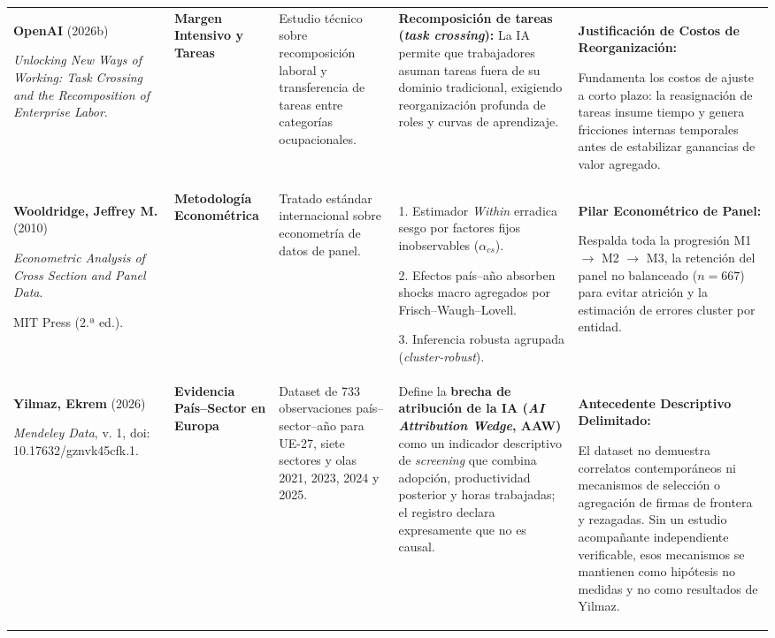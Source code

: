 \documentclass[10pt,a4paper,landscape]{article}
\begin{document}
\begin{xltabular}{\textwidth}{@{} L{4.5cm} L{3.3cm} Y Y Y @{}}
  \textbf{OpenAI} (2026b)\par
  \textit{Unlocking New Ways of Working: Task Crossing and the Recomposition of Enterprise Labor}.\par
  [\texttt{openai2026taskcrossing}] &
  \textbf{Margen Intensivo y Tareas} &
  Estudio técnico sobre recomposición laboral y transferencia de tareas entre categorías ocupacionales. &
  \textbf{Recomposición de tareas (\textit{task crossing}):} La IA permite que trabajadores asuman tareas fuera de su dominio tradicional, exigiendo reorganización profunda de roles y curvas de aprendizaje. &
  \textbf{Justificación de Costos de Reorganización:}\par
  Fundamenta los costos de ajuste a corto plazo: la reasignación de tareas insume tiempo y genera fricciones internas temporales antes de estabilizar ganancias de valor agregado. \\
  \textbf{Wooldridge, Jeffrey M.} (2010)\par
  \textit{Econometric Analysis of Cross Section and Panel Data}.\par
  MIT Press (2.ª ed.).\par
  [\texttt{wooldridge2010econometric}] &
  \textbf{Metodología Econométrica} &
  Tratado estándar internacional sobre econometría de datos de panel. &
  1. Estimador \textit{Within} erradica sesgo por factores fijos inobservables ($\alpha_{cs}$).\par
  2. Efectos país--año absorben shocks macro agregados por Frisch--Waugh--Lovell.\par
  3. Inferencia robusta agrupada (\textit{cluster-robust}). &
  \textbf{Pilar Econométrico de Panel:}\par
  Respalda toda la progresión M1 $\rightarrow$ M2 $\rightarrow$ M3, la retención del panel no balanceado ($n=667$) para evitar atrición y la estimación de errores cluster por entidad. \\

  \textbf{Yilmaz, Ekrem} (2026)\par
  \textit{Mendeley Data}, v. 1, doi: 10.17632/gznvk45cfk.1.\par
  [\texttt{yilmaz2026dataset}] &
  \textbf{Evidencia País--Sector en Europa} &
  Dataset de 733 observaciones país--sector--año para UE-27, siete sectores y olas 2021, 2023, 2024 y 2025. &
  Define la \textbf{brecha de atribución de la IA (\textit{AI Attribution Wedge}, AAW)} como un indicador descriptivo de \textit{screening} que combina adopción, productividad posterior y horas trabajadas; el registro declara expresamente que no es causal. &
  \textbf{Antecedente Descriptivo Delimitado:}\par
  El dataset no demuestra correlatos contemporáneos ni mecanismos de selección o agregación de firmas de frontera y rezagadas. Sin un estudio acompañante independiente verificable, esos mecanismos se mantienen como hipótesis no medidas y no como resultados de Yilmaz. \\

\end{xltabular}
\end{document}
